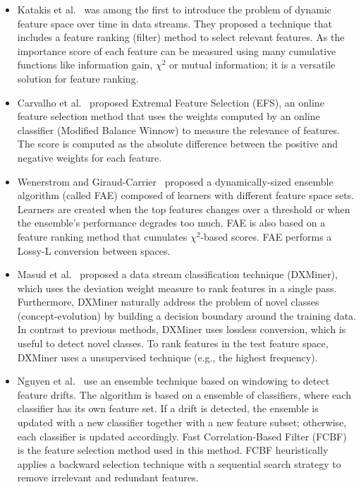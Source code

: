 \documentclass[preprint,12pt]{elsarticle}
\begin{document}
\begin{itemize}
	\item Katakis et al.~\cite{kata05} was among the first to introduce the problem of dynamic feature space over time in data streams. They proposed a technique that includes a feature ranking (filter) method to select relevant features. As the importance score of each feature can be measured using many cumulative functions like information gain, $\chi^2$ or mutual information; it is a versatile solution for feature ranking.
	\item Carvalho et al.~\cite{carva06} proposed Extremal Feature Selection (EFS), an online feature selection method that uses the weights computed by an online classifier (Modified Balance Winnow) to measure the relevance of features. The score is computed as the absolute difference between the positive and negative weights for each feature.
	\item Wenerstrom and Giraud-Carrier~\cite{wener06} proposed a dynamically-sized ensemble algorithm (called FAE) composed of learners with different feature space sets. Learners are created when the top features changes over a threshold or when the ensemble's performance degrades too much. FAE is also based on a feature ranking method that cumulates $\chi^2$-based scores. FAE performs a Lossy-L conversion between spaces. %
	\item Masud et al.~\cite{masud10} proposed a data stream classification technique (DXMiner), which uses the deviation weight measure to rank features in a single pass. Furthermore, DXMiner naturally address the problem of novel classes (concept-evolution) by building a decision boundary around the training data. In contrast to previous methods, DXMiner uses lossless conversion, which is useful to detect novel classes. To rank features in the test feature space, DXMiner uses a unsupervised technique (e.g., the highest frequency).
	\item Nguyen et al.~\cite{nguyen12} use an ensemble technique based on windowing to detect feature drifts. The algorithm is based on a ensemble of classifiers, where each classifier has its own feature set. If a drift is detected, the ensemble is updated with a new classifier together with a new feature subset; otherwise, each classifier is updated accordingly. Fast Correlation-Based Filter (FCBF) is the feature selection method used in this method. FCBF heuristically applies a backward selection technique with a sequential search strategy to remove irrelevant and redundant features.

\end{itemize}
\end{document}
